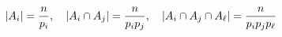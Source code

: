 \documentclass[preview]{standalone}
\begin{document}
\begin{align*}
\special{dvisvgm:raw <g id='unique000'>}|A_i|=\frac{n}{p_i},\quad|A_i\cap A_j|=\frac{n}{p_i p_j},\quad|A_i\cap A_j\cap A_\ell|=\frac{n}{p_i p_j p_\ell}\special{dvisvgm:raw </g>}
\end{align*}
\end{document}
